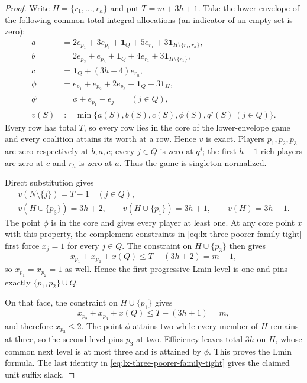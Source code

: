 \begin{proof}
Write $H=\{r_1,\ldots,r_h\}$ and put $T=m+3h+1$.  Take the lower envelope of
the following common-total integral allocations (an indicator of an empty
set is zero):
\[
\begin{aligned}
 a&=2e_{p_1}+3e_{p_3}+\mathbf1_Q
       +5e_{r_1}+3\mathbf1_{H\setminus\{r_1,r_h\}},\\
 b&=2e_{p_2}+e_{p_3}+\mathbf1_Q
       +4e_{r_1}+3\mathbf1_{H\setminus\{r_1\}},\\
 c&=\mathbf1_Q+(3h+4)e_{r_h},\\
 \phi&=e_{p_1}+e_{p_2}+2e_{p_3}+\mathbf1_Q+3\mathbf1_H,\\
 q^j&=\phi+e_{p_1}-e_j\qquad(j\in Q),\\
 v(S)&:=\min\{a(S),b(S),c(S),\phi(S),q^j(S)\ (j\in Q)\}.
\end{aligned}                                                     \tag{TH}
\label{eq:lx-three-poorer-family}
\]
Every row has total $T$, so every row lies in the core of the lower-envelope
game and every coalition attains its worth at a row.  Hence $v$ is exact.
Players $p_1,p_2,p_3$ are zero respectively at $b,a,c$; every $j\in Q$ is
zero at $q^j$; the first $h-1$ rich players are zero at $c$ and $r_h$ is
zero at $a$.  Thus the game is singleton-normalized.

Direct substitution gives
\[
\begin{gathered}
 v(N\setminus\{j\})=T-1\quad(j\in Q),\\
 v(H\cup\{p_3\})=3h+2,\qquad
 v(H\cup\{p_1\})=3h+1,\qquad v(H)=3h-1.       \tag{TH-T}
 \label{eq:lx-three-poorer-family-tight}
\end{gathered}
\]
The point $\phi$ is in the core and gives every player at least one.  At any
core point $x$ with this property, the complement constraints in
\eqref{eq:lx-three-poorer-family-tight} first force $x_j=1$ for every
$j\in Q$.  The constraint on $H\cup\{p_3\}$ then gives
\[
 x_{p_1}+x_{p_2}+x(Q)\leq T-(3h+2)=m-1,
\]
so $x_{p_1}=x_{p_2}=1$ as well.  Hence the first progressive Lmin level is
one and pins exactly $\{p_1,p_2\}\cup Q$.

On that face, the constraint on $H\cup\{p_1\}$ gives
\[
 x_{p_2}+x_{p_3}+x(Q)\leq T-(3h+1)=m,
\]
and therefore $x_{p_3}\leq2$.  The point $\phi$ attains two while every
member of $H$ remains at three, so the second level pins $p_3$ at two.
Efficiency leaves total $3h$ on $H$, whose common next level is at most
three and is attained by $\phi$.  This proves the Lmin formula.  The last
identity in \eqref{eq:lx-three-poorer-family-tight} gives the claimed unit
suffix slack.


\end{proof}
